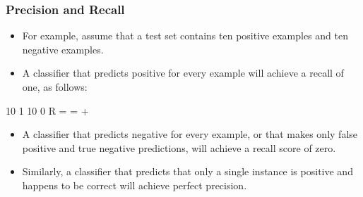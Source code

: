 \documentclass[PredictiveAnalytics101.tex]{subfiles}
\begin{document}
\begin{frame}
	\Large
\frametitle{Precision and Recall}
\begin{itemize}
\item For example, assume that a test set contains ten positive examples
and ten negative examples.
\item A classifier that predicts positive for every example will
achieve a recall of one, as follows:
\end{itemize}

10 1
10 0
R = =
+
\end{frame}
\begin{frame}
	
	\begin{itemize}
\item A classifier that predicts negative for every example, or that makes only false positive
and true negative predictions, will achieve a recall score of zero. 
\item Similarly, a classifier
that predicts that only a single instance is positive and happens to be correct will
achieve perfect precision.
	\end{itemize}

\end{frame}
\end{document}
